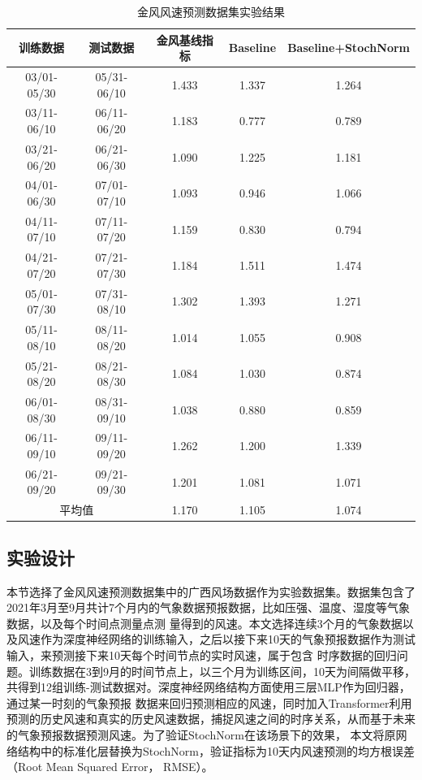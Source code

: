 \begin{table}[h]
	\begin{center}
  \caption{金风风速预测数据集实验结果}
	\label{table:goldwind}
    \begin{tabular}{ccccc}
        \toprule
        训练数据 & 测试数据 & 金风基线指标 & Baseline &  Baseline+\textbf{StochNorm}\\
        \midrule
        03/01-05/30 & 05/31-06/10 & 1.433 & 1.337 & 1.264 \\
        03/11-06/10 & 06/11-06/20 & 1.183 & 0.777 & 0.789 \\
        03/21-06/20 & 06/21-06/30 & 1.090 & 1.225 & 1.181 \\
        \cmidrule(r){1-5}
        04/01-06/30 & 07/01-07/10 & 1.093 & 0.946 & 1.066 \\
        04/11-07/10 & 07/11-07/20 & 1.159 & 0.830 & 0.794 \\
        04/21-07/20 & 07/21-07/30 & 1.184 & 1.511 & 1.474 \\
        \cmidrule(r){1-5}
        05/01-07/30 & 07/31-08/10 & 1.302 & 1.393 & 1.271 \\
        05/11-08/10 & 08/11-08/20 & 1.014 & 1.055 & 0.908 \\
        05/21-08/20 & 08/21-08/30 & 1.084 & 1.030 & 0.874 \\
        \cmidrule(r){1-5}
        06/01-08/30 & 08/31-09/10 & 1.038 & 0.880 & 0.859 \\
        06/11-09/10 & 09/11-09/20 & 1.262 & 1.200 & 1.339 \\
        06/21-09/20 & 09/21-09/30 & 1.201 & 1.081 & 1.071 \\
        \midrule
        \multicolumn{2}{c}{平均值} & 1.170 & 1.105 & 1.074 \\
        \bottomrule
    \end{tabular}
	\end{center}
\end{table}

\subsection{实验设计}

本节选择了金风风速预测数据集中的广西风场数据作为实验数据集。数据集包含了2021年3月至9月共计7个月内的气象数据预报数据，比如压强、温度、湿度等气象数据，以及每个时间点测量点测
量得到的风速。本文选择连续3个月的气象数据以及风速作为深度神经网络的训练输入，之后以接下来10天的气象预报数据作为测试输入，来预测接下来10天每个时间节点的实时风速，属于包含
时序数据的回归问题。训练数据在3到9月的时间节点上，以三个月为训练区间，10天为间隔做平移，共得到12组训练-测试数据对。深度神经网络结构方面使用三层MLP作为回归器，通过某一时刻的气象预报
数据来回归预测相应的风速，同时加入Transformer利用预测的历史风速和真实的历史风速数据，捕捉风速之间的时序关系，从而基于未来的气象预报数据预测风速。为了验证StochNorm在该场景下的效果，
本文将原网络结构中的标准化层替换为StochNorm，验证指标为10天内风速预测的均方根误差（Root Mean Squared Error， RMSE）。

